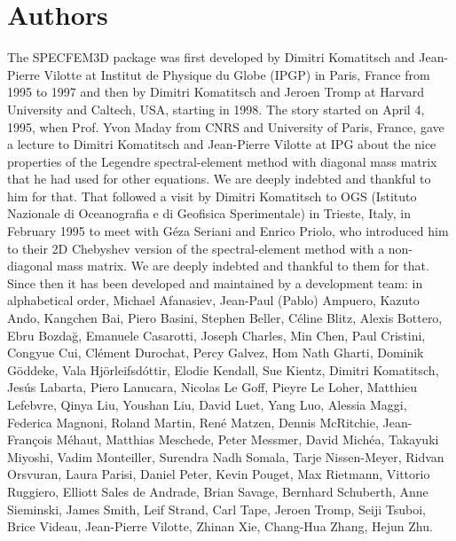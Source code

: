 \section*{Authors}

\noindent The SPECFEM3D package was first developed by Dimitri
Komatitsch and Jean-Pierre Vilotte at Institut de Physique du Globe
(IPGP) in Paris, France from 1995 to 1997 and then by Dimitri Komatitsch
and Jeroen Tromp at Harvard University and Caltech, USA, starting in 1998.
The story started on April 4, 1995, when Prof. Yvon Maday from CNRS and University of Paris, France, gave a lecture to
Dimitri Komatitsch and Jean-Pierre Vilotte at IPG about the nice properties of the Legendre spectral-element method with diagonal mass matrix that he had used for
other equations. We are deeply indebted and thankful to him for that.
That followed a visit by Dimitri Komatitsch to OGS (Istituto Nazionale di Oceanografia e di Geofisica Sperimentale) in Trieste, Italy, in February 1995
to meet with G\'eza Seriani and Enrico Priolo, who introduced him to their 2D Chebyshev version of the spectral-element method with a non-diagonal mass matrix.
We are deeply indebted and thankful to them for that.\\

Since then it has been developed and maintained by a development team: in alphabetical order,
Michael Afanasiev,
Jean-Paul (Pablo) Ampuero,
Kazuto Ando,
Kangchen Bai,
Piero Basini,
Stephen Beller,
C\'eline Blitz,
Alexis Bottero,
Ebru Bozda\u{g},
Emanuele Casarotti,
Joseph Charles,
Min Chen,
Paul Cristini,
Congyue Cui,
Cl\'ement Durochat,
Percy Galvez,
Hom Nath Gharti,
Dominik G\"oddeke,
Vala Hj\"orleifsd\'ottir,
Elodie Kendall,
Sue Kientz,
Dimitri Komatitsch,
Jes\'us Labarta,
Piero Lanucara,
Nicolas Le Goff,
Pieyre Le Loher,
Matthieu Lefebvre,
Qinya Liu,
Youshan Liu,
David Luet,
Yang Luo,
Alessia Maggi,
Federica Magnoni,
Roland Martin,
Ren\'e Matzen,
Dennis McRitchie,
Jean-Fran\c{c}ois M\'ehaut,
Matthias Meschede,
Peter Messmer,
David Mich\'ea,
Takayuki Miyoshi,
Vadim Monteiller,
Surendra Nadh Somala,
Tarje Nissen-Meyer,
Ridvan Orsvuran,
Laura Parisi,
Daniel Peter,
Kevin Pouget,
Max Rietmann,
Vittorio Ruggiero,
Elliott Sales de Andrade,
Brian Savage,
Bernhard Schuberth,
Anne Sieminski,
James Smith,
Leif Strand,
Carl Tape,
Jeroen Tromp,
Seiji Tsuboi,
Brice Videau,
Jean-Pierre Vilotte,
Zhinan Xie,
Chang-Hua Zhang,
Hejun Zhu.\\



